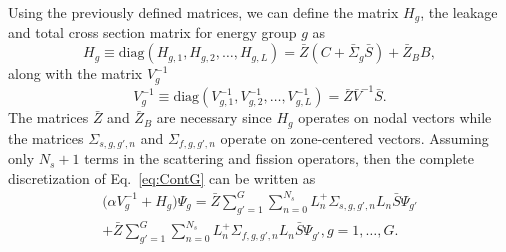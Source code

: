 Using the previously defined matrices, we can define the matrix $H_{g}$, the leakage and total cross section matrix for energy group $g$ as
\begin{equation}
	H_{g} \equiv \text{diag}(H_{g,1}, H_{g,2}, \dots, H_{g,L}) = \bar{Z}(C + \bar{\Sigma}_{g} \bar{S}) + \bar{Z}_{B}B,
\end{equation}
along with the matrix $V^{-1}_{g}$
\begin{equation}
	V^{-1}_{g} \equiv \text{diag}(V^{-1}_{g,1}, V^{-1}_{g,2}, \dots, V^{-1}_{g,L}) = \bar{Z} \bar{V}^{-1} \bar{S}.
\end{equation}
The matrices $\bar{Z}$ and $\bar{Z}_{B}$ are necessary since $H_{g}$ operates on nodal vectors while the matrices $\Sigma_{s,g,g',n}$ and $\Sigma_{f,g,g',n}$ operate on zone-centered vectors. Assuming only $N_{s} + 1$ terms in the scattering and fission operators, then the complete discretization of Eq.~\ref{eq:ContG} can be written as
\begin{multline}
\big ( \alpha V^{-1}_{g} + H_{g} \big ) \Psi_{g} = \bar{Z} \sum_{g'=1}^{G} \sum_{n=0}^{N_{s}} L_{n}^{+} \Sigma_{s,g,g',n} L_{n} \bar{S} \Psi_{g'} \\ + \bar{Z}\sum_{g'=1}^{G} \sum_{n=0}^{N_{s}} L_{n}^{+} \Sigma_{f,g,g',n} L_{n} \bar{S} \Psi_{g'}, g = 1, \dots, G.
\end{multline}

